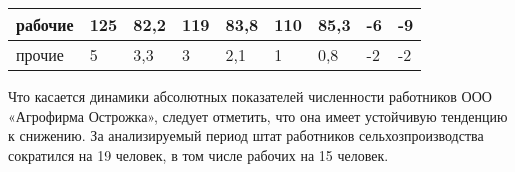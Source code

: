 \begin{table}[!h]
\begin{tabularx}{\textwidth}{|p{3.85cm}|K{1cm}|K{1cm}|K{1cm}|K{1cm}|K{1cm}|K{1cm}|K{1.6cm}|K{1.6cm}|}
		рабочие                                & 125                       & 82,2                    & 119                       & 83,8                    & 110                       & 85,3                    & -6                                     & -9                                     \\ \hline
		прочие                                 & 5                         & 3,3                     & 3                         & 2,1                     & 1                         & 0,8                     & -2                                     & -2                                     \\ \hline
	\end{tabularx}
\end{table}


Что касается динамики абсолютных показателей численности работников ООО «Агрофирма Острожка», следует отметить, что она имеет устойчивую тенденцию к снижению. За анализируемый период штат работников сельхозпроизводства сократился на 19 человек, в том числе  рабочих на 15 человек.

